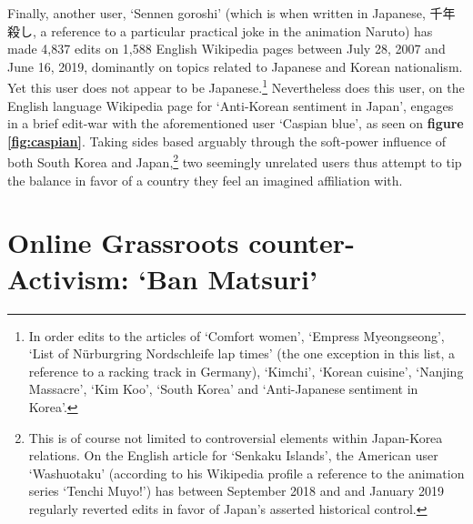 \documentclass[10pt,british,A4paper,,openany]{memoir}
\begin{document}
Finally, another user, `Sennen goroshi' (which is when written in
Japanese, 千年殺し, a reference to a particular practical joke in the
animation Naruto) has made 4,837 edits on 1,588 English Wikipedia pages
between July 28, 2007 and June 16, 2019, dominantly on topics related to
Japanese and Korean nationalism. Yet this user does not appear to be
Japanese.\footnote{In order edits to the articles of `Comfort women',
  `Empress Myeongseong', `List of Nürburgring Nordschleife lap times'
  (the one exception in this list, a reference to a racking track in
  Germany), `Kimchi', `Korean cuisine', `Nanjing Massacre', `Kim Koo',
  `South Korea' and `Anti-Japanese sentiment in Korea'.} Nevertheless
does this user, on the English language Wikipedia page for `Anti-Korean
sentiment in Japan', engages in a brief edit-war with the aforementioned
user `Caspian blue', as seen on \textbf{figure \ref{fig:caspian}}.
Taking sides based arguably through the soft-power influence of both
South Korea and Japan,\footnote{This is of course not limited to
  controversial elements within Japan-Korea relations. On the English
  article for `Senkaku Islands', the American user `Washuotaku'
  (according to his Wikipedia profile a reference to the animation
  series `Tenchi Muyo!') has between September 2018 and and January 2019
  regularly reverted edits in favor of Japan's asserted historical
  control.} two seemingly unrelated users thus attempt to tip the
balance in favor of a country they feel an imagined affiliation with.

\section{\texorpdfstring{Online Grassroots counter-Activism: `Ban
Matsuri'}{Online Grassroots counter-Activism: Ban Matsuri}}\label{online-grassroots-counter-activism-ban-matsuri}
\end{document}

